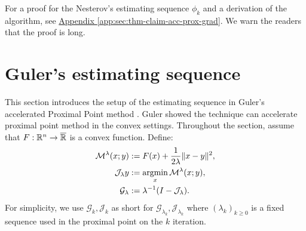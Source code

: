 \documentclass[12pt]{article}
\begin{document}
    For a proof for the Nesterov's estimating sequence $\phi_k$ and a derivation of the algorithm, see
    \hyperref[app:sec:thm-claim-acc-prox-grad]{Appendix \ref*{app:sec:thm-claim-acc-prox-grad}}. 
    We warn the readers that the proof is long. 

\section{Guler's estimating sequence}
    This section introduces the setup of the estimating sequence in Guler's accelerated Proximal Point method \cite{guler_new_1992}. 
    Guler showed the technique can accelerate proximal point method in the convex settings. 
    Throughout the section, assume that $F:\mathbb R^n \rightarrow \overline {\mathbb R}$ is a convex function. 
    Define:
    \begin{align*}
        \mathcal M^{\lambda} (x; y) &:= F(x) + \frac{1}{2\lambda}\Vert x - y\Vert^2, 
        \\
        \mathcal J_\lambda y &:= \mathop{\rm argmin}\limits_x \mathcal M^{\lambda} (x; y), 
        \\
        \mathcal G_\lambda &:= \lambda^{-1}(I - \mathcal J_\lambda). 
    \end{align*}
    For simplicity, we use $\mathcal G_k, \mathcal J_k$ as short for $\mathcal G_{\lambda_k}, \mathcal J_{\lambda_k}$ where $(\lambda_k)_{k \ge 0}$ is a fixed sequence used in the proximal point on the $k$ iteration. 
    
\end{document}
